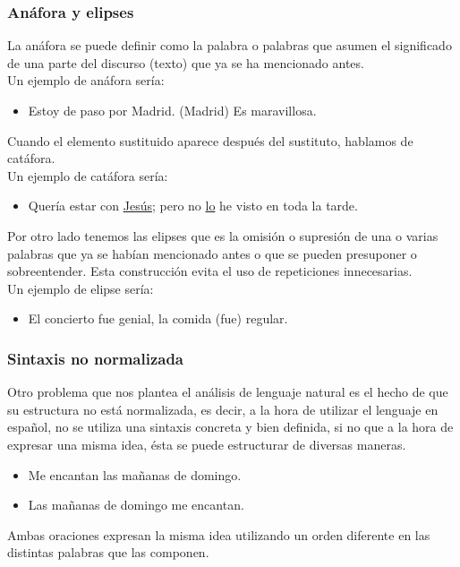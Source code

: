 \documentclass[../all.tex]{subfiles}
\begin{document}
\subsubsection{Anáfora y elipses}
	La anáfora se puede definir como la palabra o palabras que asumen el significado de una parte del discurso (texto) que ya se ha mencionado antes.\\
	
	Un ejemplo de anáfora sería:
	\begin{itemize}[resume]
		\item Estoy de paso por Madrid. {\small(Madrid)} Es maravillosa. 
	\end{itemize}
	Cuando el elemento sustituido aparece después del sustituto, hablamos de catáfora.\\
	Un ejemplo de catáfora sería:
	\begin{itemize}[resume]
		\item Quería estar con \underline{Jesús}; pero no \underline{lo} he visto en toda la tarde. 
	\end{itemize}

	Por otro lado tenemos las elipses que es la omisión o supresión de una o varias palabras que ya se habían mencionado antes o que se pueden presuponer o sobreentender. Esta construcción evita el uso de repeticiones innecesarias.\\
	Un ejemplo de elipse sería:
	\begin{itemize}[resume]
		\item El concierto fue genial, la comida {\small(fue)} regular. 
	\end{itemize}
\subsubsection{Sintaxis no normalizada}
	 Otro problema que nos plantea el análisis de lenguaje natural es el hecho de que su estructura no está normalizada, es decir, a la hora de utilizar el lenguaje en español, no se utiliza una sintaxis concreta y bien definida, si no que a la hora de expresar una misma idea, ésta se puede estructurar de diversas maneras.
 	\begin{itemize}[resume]
	 	\item Me encantan las mañanas de domingo.
	 	\item Las mañanas de domingo me encantan.
 	\end{itemize}
	 Ambas oraciones expresan la misma idea utilizando un orden diferente en las distintas palabras que las componen.
\newpage
\end{document}
